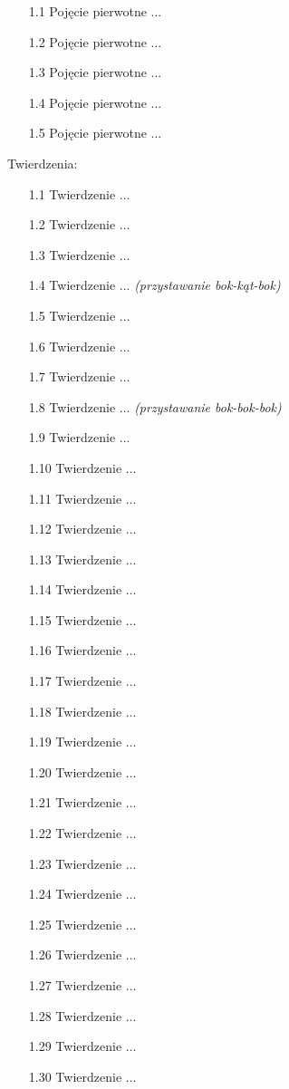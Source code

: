 \begin{enumerate}
\item [1.1] Pojęcie pierwotne ...
\item [1.2] Pojęcie pierwotne ...
\item [1.3] Pojęcie pierwotne ...
\item [1.4] Pojęcie pierwotne ...
\item [1.5] Pojęcie pierwotne ...
\end{enumerate} Twierdzenia: \begin{enumerate}
\item [1.1] Twierdzenie ...
\item [1.2] Twierdzenie ...
\item [1.3] Twierdzenie ...
\item [1.4] Twierdzenie ... \hfill \emph{(przystawanie bok-kąt-bok)}
\item [1.5] Twierdzenie ...
\item [1.6] Twierdzenie ...
\item [1.7] Twierdzenie ...
\item [1.8] Twierdzenie ... \hfill \emph{(przystawanie bok-bok-bok)}
\item [1.9] Twierdzenie ...
\item [1.10] Twierdzenie ...
\item [1.11] Twierdzenie ...
\item [1.12] Twierdzenie ...
\item [1.13] Twierdzenie ...
\item [1.14] Twierdzenie ...
\item [1.15] Twierdzenie ...
\item [1.16] Twierdzenie ...
\item [1.17] Twierdzenie ...
\item [1.18] Twierdzenie ...
\item [1.19] Twierdzenie ...
\item [1.20] Twierdzenie ...
\item [1.21] Twierdzenie ...
\item [1.22] Twierdzenie ...
\item [1.23] Twierdzenie ...
\item [1.24] Twierdzenie ...
\item [1.25] Twierdzenie ...
\item [1.26] Twierdzenie ...
\item [1.27] Twierdzenie ...
\item [1.28] Twierdzenie ...
\item [1.29] Twierdzenie ...
\item [1.30] Twierdzenie ...

\end{enumerate}
